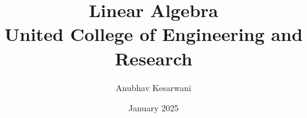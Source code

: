\documentclass{report}
\title{Linear Algebra\\
{\small United College of Engineering and Research}}
\author{Anubhav Kesarwani}
\date{January 2025}
\begin{document}
\ifx\isPandoc\undefined
\maketitle
\fi



\tableofcontents





\end{document}
